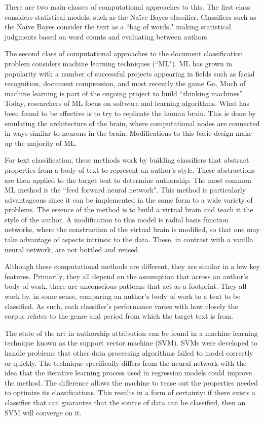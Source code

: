 \documentclass[11pt,letterpaper]{article}
\begin{document}
There are two main classes of computational approaches to this. The first class considers statistical models, such as the Na{\"i}ve Bayes classifier. Classifiers such as the Na{\"i}ve Bayes consider the text as a ``bag of words," making statistical judgments based on word counts and evaluating between authors.

The second class of computational approaches to the document classification problem considers machine learning techniques (``ML"). ML has grown in popularity with a number of successful projects appearing in fields such as facial recognition, document compression, and most recently the game Go. Much of machine learning is part of the ongoing project to build “thinking machines”. Today, researchers of ML focus on software and learning algorithms. What has been found to be effective is to try to replicate the human brain. This is done by emulating the architecture of the brain, where computational nodes are connected in ways similar to neurons in the brain. Modifications to this basic design make up the majority of ML.

For text classification, these methods work by building classifiers that abstract properties from a body of text to represent an author's style. These abstractions are then applied to the target text to determine authorship. The most common ML method is the ``feed forward neural network". This method is particularly advantageous since it can be implemented in the same form to a wide variety of problems. The essence of the method is to build a virtual brain and teach it the style of the author. A modification to this model is radial basis function networks, where the construction of the virtual brain is modified, so that one may take advantage of aspects intrinsic to the data. These, in contrast with a vanilla neural network, are not bottled and reused.

Although these computational methods are different, they are similar in a few key features. Primarily, they all depend on the assumption that across an author's body of work, there are unconscious patterns that act as a footprint. They all work by, in some sense, comparing an author's body of work to a text to be classified. As such, each classifier's performance varies with how closely the corpus relates to the genre and period from which the target text is from.

The state of the art in authorship attribution can be found in a machine learning technique known as the support vector machine (SVM). SVMs were developed to handle problems that other data processing algorithms failed to model correctly or quickly. The technique specifically differs from the neural network with the idea that the iterative learning process used in regression models could improve the method. The difference allows the machine to tease out the properties needed to optimize its classifications. This results in a form of certainty: if there exists a classifier that can guarantee that the source of data can be classified, then an SVM will converge on it.
\end{document}
